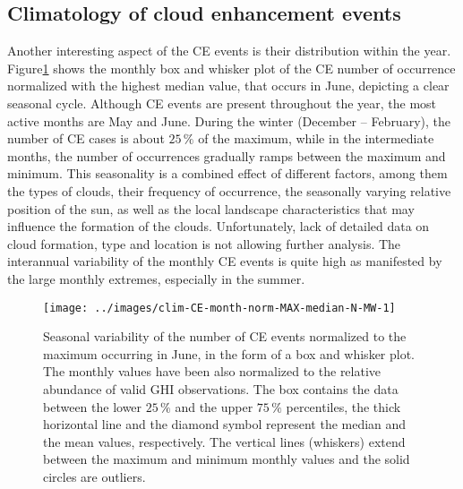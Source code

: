 \documentclass[preprint, 5p,
authoryear]{elsarticle} %
\begin{document}
\hypertarget{climatology-of-cloud-enhancement-events}{%
\subsection{Climatology of cloud enhancement
events}\label{climatology-of-cloud-enhancement-events}}

Another interesting aspect of the CE events is their distribution within
the year. Figure\nobreakspace{}\ref{fig:relative-month-occurrences}
shows the monthly box and whisker plot of the CE number of occurrence
normalized with the highest median value, that occurs in June, depicting
a clear seasonal cycle. Although CE events are present throughout the
year, the most active months are May and June. During the winter
(December -- February), the number of CE cases is about \(25\,\%\) of
the maximum, while in the intermediate months, the number of occurrences
gradually ramps between the maximum and minimum. This seasonality is a
combined effect of different factors, among them the types of clouds,
their frequency of occurrence, the seasonally varying relative position
of the sun, as well as the local landscape characteristics that may
influence the formation of the clouds. Unfortunately, lack of detailed
data on cloud formation, type and location is not allowing further
analysis. The interannual variability of the monthly CE events is quite
high as manifested by the large monthly extremes, especially in the
summer.

\begin{figure}

{\centering \texttt{[image: ../images/clim-CE-month-norm-MAX-median-N-MW-1]} 

}

\caption{Seasonal variability of the number of CE events normalized to the maximum occurring in June, in the form of a box and whisker plot. The monthly values have been also normalized to the relative abundance of valid GHI observations. The box contains the data between the lower $25\,\%$ and the upper $75\,\%$ percentiles, the thick horizontal line and the diamond symbol represent the median and the mean values, respectively. The vertical lines (whiskers) extend between the maximum and minimum monthly values and the solid circles are outliers.}\label{fig:relative-month-occurrences}
\end{figure}
\end{document}
